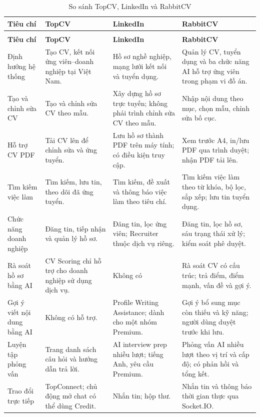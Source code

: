 \begingroup
\small
\setlength{\tabcolsep}{4pt}
\renewcommand{\arraystretch}{1.2}
\begin{longtable}{|>{\raggedright\arraybackslash}p{}|>{\raggedright\arraybackslash}p{}|>{\raggedright\arraybackslash}p{}|>{\raggedright\arraybackslash}p{}|}
    \caption{So sánh TopCV, LinkedIn và RabbitCV}
    \label{tab:system-comparison}\\
    \hline
    \textbf{Tiêu chí} & \textbf{TopCV} & \textbf{LinkedIn} & \textbf{RabbitCV} \\\hline
    \endfirsthead
    \multicolumn{4}{c}{\textit{Bảng~\ref{tab:system-comparison} (tiếp theo)}}\\
    \hline
    \textbf{Tiêu chí} & \textbf{TopCV} & \textbf{LinkedIn} & \textbf{RabbitCV} \\\hline
    \endhead
    \endfoot
    \endlastfoot
    Định hướng hệ thống & Tạo CV, kết nối ứng viên--doanh nghiệp tại Việt Nam. & Hồ sơ nghề nghiệp, mạng lưới kết nối và tuyển dụng. & Quản lý CV, tuyển dụng và ba chức năng AI hỗ trợ ứng viên trong phạm vi đồ án. \\\hline
    Tạo và chỉnh sửa CV & Tạo và chỉnh sửa CV theo mẫu. & Xây dựng hồ sơ trực tuyến; không phải trình chỉnh sửa CV theo mẫu. & Nhập nội dung theo mục, chọn mẫu, chỉnh sửa bố cục. \\\hline
    Hỗ trợ CV PDF & Tải CV lên để chỉnh sửa và ứng tuyển. & Lưu hồ sơ thành PDF trên máy tính; có điều kiện truy cập. & Xem trước A4, in/lưu PDF qua trình duyệt; nhận PDF tải lên. \\\hline
    Tìm kiếm việc làm & Tìm kiếm, lưu tin, theo dõi đã ứng tuyển. & Tìm kiếm, đề xuất và thông báo việc làm theo tiêu chí. & Tìm kiếm việc làm theo từ khóa, bộ lọc, sắp xếp; lưu tin tuyển dụng. \\\hline
    Chức năng doanh nghiệp & Đăng tin, tiếp nhận và quản lý hồ sơ. & Đăng tin, lọc ứng viên; Recruiter thuộc dịch vụ riêng. & Đăng tin, lọc hồ sơ, sáu trạng thái xử lý; kiểm soát phê duyệt. \\\hline
    Rà soát hồ sơ bằng AI & CV Scoring chỉ hỗ trợ cho doanh nghiệp sử dụng dịch vụ. & Không có & Rà soát CV có cấu trúc; trả điểm, điểm mạnh, vấn đề và gợi ý. \\\hline
    Gợi ý viết nội dung bằng AI & Không có hỗ trợ. & Profile Writing Assistance; dành cho một nhóm Premium. & Gợi ý bổ sung mục còn thiếu và kỹ năng; người dùng duyệt trước khi lưu. \\\hline
    Luyện tập phỏng vấn & Trang danh sách câu hỏi và hướng dẫn trả lời. & AI interview prep nhiều lượt; tiếng Anh, yêu cầu Premium. & Phỏng vấn AI nhiều lượt theo vị trí và cấp độ; có phản hồi và tổng kết. \\\hline
    Trao đổi trực tiếp & TopConnect; chủ động mở chat có thể dùng Credit. & Nhắn tin; hộp thư. & Nhắn tin và thông báo thời gian thực qua Socket.IO. \\\hline
\end{longtable}
\endgroup

